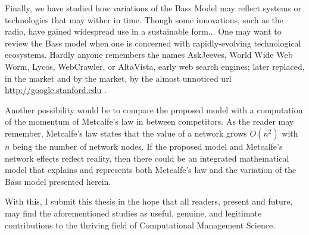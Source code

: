 Finally, we have studied how variations of the Bass Model may reflect systems or technologies that may wither in time. Though some innovations, such as the radio, have gained widespread use in a sustainable form... One may want to review the Bass model when one is concerned with rapidly-evolving technological ecosystems.  Hardly anyone remembers the names AskJeeves, World Wide Web Worm, Lycos, WebCrawler, or AltaVista, early web search engines; later replaced, in the market and by the market, by the almost unnoticed url \url{http://google.stanford.edu} \citep{brin1998anatomy}.


Another possibility would be to compare the proposed model with a computation of the momentum of Metcalfe’s law in between competitors.  As the reader may remember, Metcalfe’s law states that the value of a network grows $O(n^2)$ with $n$ being the number of network nodes.   If the proposed model and Metcalfe’s network effects reflect reality, then there could be an integrated mathematical model that explains and represents both Metcalfe’s law and the variation of the Bass model presented herein.

With this, I submit this thesis in the hope that all readers, present and future, may find the aforementioned studies as useful, genuine, and legitimate contributions to the thriving field of Computational Management Science.
